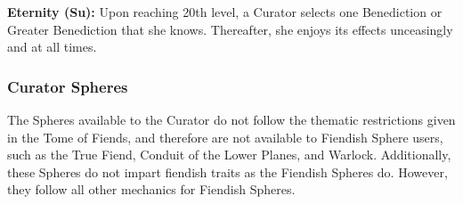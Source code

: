 \textbf{Eternity (Su):} Upon reaching 20th level, a Curator selects one Benediction or Greater Benediction that she knows. Thereafter, she enjoys its effects unceasingly and at all times.

\subsubsection{Curator Spheres}

The Spheres available to the Curator do not follow the thematic restrictions given in the Tome of Fiends, and therefore are not available to Fiendish Sphere users, such as the True Fiend, Conduit of the Lower Planes, and Warlock. Additionally, these Spheres do not impart fiendish traits as the Fiendish Spheres do. However, they follow all other mechanics for Fiendish Spheres.

